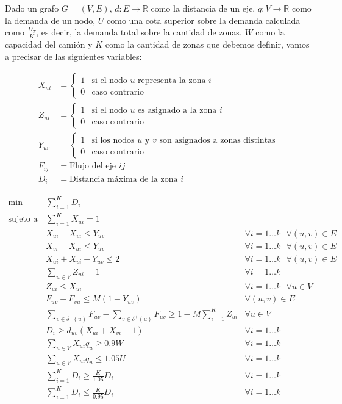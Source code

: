 Dado un grafo $G = (V,E)$,  $d:E\rightarrow \mathbb{R}$ como la distancia de un eje, $q:V\rightarrow \mathbb{R}$ como la demanda de un nodo, $U$ como una cota superior sobre la demanda calculada como $\frac{D_T}K$, es decir, la demanda total sobre la cantidad de zonas. $W$ como la capacidad del camión y $K$ como la  cantidad de zonas que debemos definir, vamos a precisar de las siguientes variables:

\begin{align*}
    X_{ui} &= 
    \begin{cases}
        1 & \text{si el nodo } u \text{ representa la zona } i \\
        0 & \text{caso contrario}
    \end{cases} \\
    Z_{ui} &= 
    \begin{cases}
        1 & \text{si el nodo } u \text{ es asignado a la zona } i \\
        0 & \text{caso contrario}
    \end{cases} \\
    Y_{uv} &= 
    \begin{cases}
        1 & \text{si los nodos } u \text{ y } v \text{ son asignados a zonas distintas}\\
        0 & \text{caso contrario}
    \end{cases} \\
    F_{ij} &= \text{Flujo del eje } ij \\
    D_i &= \text{Distancia máxima de la zona } i
\end{align*}

\begin{align}
    \min \quad & \sum^K_{i=1} D_i \\
    \text{sujeto a} \quad & \sum^K_{i=1} X_{ui} = 1 & \\
    & X_{ui} - X_{vi} \leq Y_{uv} & \forall i = 1\dots k \text{ } \forall (u,v) \in E\\
    & X_{vi} - X_{ui} \leq Y_{uv} & \forall i = 1\dots k \text{ } \forall (u,v) \in E\\
    & X_{ui} + X_{vi} + Y_{uv} \leq 2 & \forall i = 1\dots k \text{ } \forall (u,v) \in E\\
    & \sum_{u\in V} Z_{ui} = 1 & \forall i=1\dots k \\
    & Z_{ui} \leq X_{ui} & \forall i=1\dots k \text{ } \forall u \in V\\
    & F_{uv} + F_{vu} \leq M(1 - Y_{uv}) & \forall (u,v) \in E \\
    & \sum_{v \in \delta^-(u)} F_{uv} - \sum_{v \in \delta^+(u)} F_{uv} \geq 1 - M\sum^K_{i=1}Z_{ui} &\forall u \in V \\
    & D_i \geq d_{uv} (X_{ui} + X_{vi} - 1) & \forall i = 1\dots k \\
    & \sum_{u\in V} X_{ui} q_u \geq 0.9 W & \forall i = 1\dots k \\
    & \sum_{u\in V} X_{ui} q_u \leq 1.05 U & \forall i = 1\dots k \\
    & \sum^K_{i = 1} D_i \geq \frac{K}{1.05} D_i & \forall i = 1\dots k \\
    & \sum^K_{i = 1} D_i \leq \frac{K}{0.95} D_i & \forall i = 1\dots k
\end{align}

